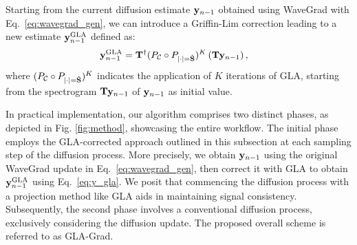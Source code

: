 Starting from the current diffusion estimate $\mathbf{y}_{n-1}$ obtained using WaveGrad with Eq.~\eqref{eq:wavegrad_gen}, we can introduce a Griffin-Lim correction leading to a new estimate $\mathbf{y}_{n-1}^{\text{GLA}}$ defined as:
\begin{equation}
\begin{split}
   \mathbf{y}_{n-1}^{\text{GLA}} & =\mathbf{T}^{\dagger} (P_{\mathcal{C}} \circ  P_{|\cdot|=\hat{\mathbf{S}}})^K \left(\mathbf{T}\mathbf{y}_{n-1} \right),
   \label{eq:y_gla}
\end{split}
\end{equation}
where $(P_{\mathcal{C}} \circ  P_{|\cdot|=\hat{\mathbf{S}}})^K$ indicates the application of $K$ iterations of GLA, starting from the spectrogram $\mathbf{T}\mathbf{y}_{n-1}$ of $\mathbf{y}_{n-1}$ as initial value.
\fi


In practical implementation, our algorithm comprises two distinct phases, as depicted in Fig. \ref{fig:method}, showcasing the entire workflow. The initial phase employs the GLA-corrected approach outlined in this subsection at each sampling step of the diffusion process. More precisely, we obtain $\mathbf{y}_{n-1}$ using the original WaveGrad update in Eq.~\eqref{eq:wavegrad_gen}, then correct it with GLA to obtain $\mathbf{y}_{n-1}^{\text{GLA}}$ using Eq.~\eqref{eq:y_gla}. We posit that commencing the diffusion process with a projection method like GLA aids in maintaining signal consistency. Subsequently, the second phase involves a conventional diffusion process, exclusively considering the diffusion update. The proposed overall scheme is referred to as GLA-Grad.